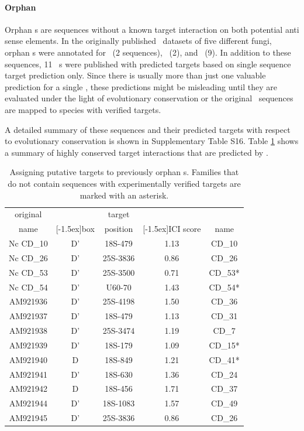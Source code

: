\paragraph{\textbf{Orphan \sno}}
Orphan \sno s are sequences without a known target interaction on both
potential anti sense elements. In the originally published \sno\
datasets of five different fungi, orphan \cd s were annotated for
\sce\ (2 sequences), \ncr\ (2), and \afu\ (9). In addition to these
sequences, 11 \ncr\ \sno s were published with predicted targets
based on single sequence target prediction only. Since there is
usually more than just one valuable prediction for a single \sno,
these predictions might be misleading until they are evaluated under
the light of evolutionary conservation or the original \sno\ sequences
are mapped to species with verified targets.

A detailed summary of these sequences and their predicted targets with
respect to evolutionary conservation is shown in Supplementary Table
S16. Table \ref{tab:orphan_cd_snoRNAs_short} shows a summary of highly
conserved target interactions that are predicted by \snostrip.

\begin{table}
  \caption{Assigning putative targets to previously
    orphan \cd s. Families that do not contain sequences with
    experimentally verified targets are marked with an asterisk. }
  \label{tab:orphan_cd_snoRNAs_short}
  \begin{center}
    \begin{footnotesize}
      \begin{tabular}{c|c|c|c|c}
      original&&target&&\snostrip\\
      name&\raisebox{1.5ex}[-1.5ex]{box}&position&\raisebox{1.5ex}[-1.5ex]{ICI
      score}&name\\
  \hline
  Nc CD\_10&D'&18S-479&1.13&CD\_10\\
\hline
  Nc CD\_26&D'&25S-3836&0.86&CD\_26\\
\hline
  Nc CD\_53&D'&25S-3500&0.71&CD\_53*\\
\hline
  Nc CD\_54&D'&U60-70&1.43&CD\_54*\\
 \hline
  AM921936&D'&25S-4198&1.50&CD\_36\\
\hline
  AM921937&D'&18S-479&1.13&CD\_31\\
\hline
  AM921938&D'&25S-3474&1.19&CD\_7\\
\hline
  AM921939&D'&18S-179&1.09&CD\_15*\\
\hline
  AM921940&D&18S-849&1.21&CD\_41*\\
\hline
  AM921941&D'&18S-630&1.36&CD\_24\\
\hline
  AM921942&D&18S-456&1.71&CD\_37\\
\hline
  AM921944&D'&18S-1083&1.57&CD\_49\\
\hline
  AM921945&D'&25S-3836&0.86&CD\_26\\
    \end{tabular}
    \end{footnotesize}
  \end{center} 
\end{table}


